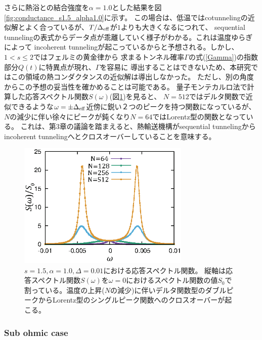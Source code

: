 さらに熱浴との結合強度を$\alpha=1.0$とした結果を図\ref{fig:conductance_s1.5_alpha1.0}に示す。
この場合は、低温ではcotunnelingの近似解とよく合っているが、$T/\Delta_{\rm eff}$が$1$よりも大きくなるにつれて、
sequential tunnelingの表式からデータ点が乖離していく様子がわかる。これは温度ゆらぎによって
incoherent tunnelingが起こっているからと予想される。しかし、$1<s\leq2$ではフェルミの黄金律から
求まるトンネル確率$\Gamma$の式(\ref{Gamma})の指数部分$Q(t)$に特異点が現れ\cite{Weiss99}、$\Gamma$を容易に
導出することはできないため、本研究ではこの領域の熱コンダクタンスの近似解は導出しなかった。
ただし、別の角度からこの予想の妥当性を確かめることは可能である。
量子モンテカルロ法で計算した応答スペクトル関数$S(\omega)$(図\ref{fig:spect_delta0.01_alpha1.0})を見ると、
$N=512$ではデルタ関数で近似できるような$\omega=\pm \Delta_{\rm eff}$近傍に鋭い２つのピークを持つ関数になっているが、
$N$の減少に伴い徐々にピークが鈍くなり$N=64$ではLorentz型の関数となっている。
これは、第3章の議論を踏まえると、熱輸送機構がsequential tunnelingからincoherent tunnelingへとクロスオーバーしていることを意味する。

\begin{figure}[tb]
	\centering
	\includegraphics[height=6cm]{spect_delta0.01_alpha1.0.eps}
	\caption{
	$s=1.5,\alpha=1.0,\Delta=0.01$における応答スペクトル関数。
	縦軸は応答スペクトル関数$S(\omega)$を$\omega=0$におけるスペクトル関数の値$S_0$で割っている。温度の上昇($N$の減少)に伴いデルタ関数型のダブルピークからLorentz型のシングルピーク関数へのクロスオーバーが起こる。
	}
	\label{fig:spect_delta0.01_alpha1.0}
\end{figure}

\subsubsection{Sub ohmic case}

